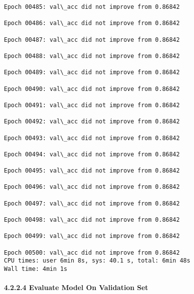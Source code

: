 \documentclass[11pt]{article}
\begin{document}
\begin{Verbatim}[commandchars=\\\{\}]
Epoch 00485: val\_acc did not improve from 0.86842

Epoch 00486: val\_acc did not improve from 0.86842

Epoch 00487: val\_acc did not improve from 0.86842

Epoch 00488: val\_acc did not improve from 0.86842

Epoch 00489: val\_acc did not improve from 0.86842

Epoch 00490: val\_acc did not improve from 0.86842

Epoch 00491: val\_acc did not improve from 0.86842

Epoch 00492: val\_acc did not improve from 0.86842

Epoch 00493: val\_acc did not improve from 0.86842

Epoch 00494: val\_acc did not improve from 0.86842

Epoch 00495: val\_acc did not improve from 0.86842

Epoch 00496: val\_acc did not improve from 0.86842

Epoch 00497: val\_acc did not improve from 0.86842

Epoch 00498: val\_acc did not improve from 0.86842

Epoch 00499: val\_acc did not improve from 0.86842

Epoch 00500: val\_acc did not improve from 0.86842
CPU times: user 6min 8s, sys: 40.1 s, total: 6min 48s
Wall time: 4min 1s

    \end{Verbatim}

    \hypertarget{evaluate-model-on-validation-set}{%
\paragraph{4.2.2.4 Evaluate Model On Validation
Set}\label{evaluate-model-on-validation-set}}
\end{document}
